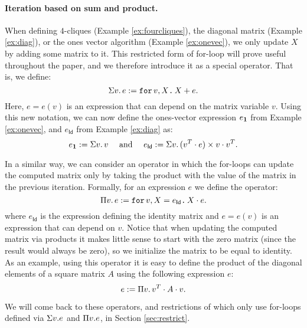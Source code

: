 \paragraph{Iteration based on sum and product.} When defining $4$-cliques (Example \ref{ex:fourcliques}), the diagonal matrix (Example \ref{ex:diag}), or the ones vector algorithm (Example \ref{ex:onevec}), we 
 only update $X$ by adding some matrix to it. This restricted form of for-loop will prove useful throughout the paper, and we therefore introduce it as a special operator. That is, we define:
$$\Sigma v. \, e := \texttt{for}\, v,X \texttt{.}\, X + e.$$
Here, $e=e(v)$ is an expression that can depend on the matrix variable $v$. 
Using this new notation, we can now define the ones-vector expression $e_{\mathbf{1}}$ from Example \ref{ex:onevec}, and $e_\mathsf{Id}$ from Example \ref{ex:diag} as:
\[ e_{\ones} := \Sigma v. \, v \ \ \ \text{ and } \ \ \ 
e_\mathsf{Id} := \Sigma v. \, (v^T\cdot e)\times v\cdot v^T.
\]

In a similar way, we can consider an operator in which the for-loops can update the computed matrix only by taking the product with the value of the matrix in the previous iteration. Formally, for an expression $e$ we define the operator:
$$
\Pi v.\,  e :=\texttt{for}\, v,X = e_{\mathsf{Id}} \texttt{.}\, X\cdot e.
$$
where $e_{\mathsf{Id}}$ is the expression defining the identity matrix and $e=e(v)$ is an expression that can depend on $v$. Notice that when updating the computed matrix via products it makes little sense to start with the zero matrix (since the result would always be zero), so we initialize the matrix to be equal to identity. 
As an example, using this operator it is easy to define the product of the diagonal elements of a square matrix $A$ using the following expression $e$:
$$
e := \Pi v. \, v^T\cdot A \cdot v.
$$

We will come back to these operators, and restrictions of \langfor which only use for-loops defined via $\Sigma v.e$ and $\Pi v.e$, in Section \ref{sec:restrict}.

